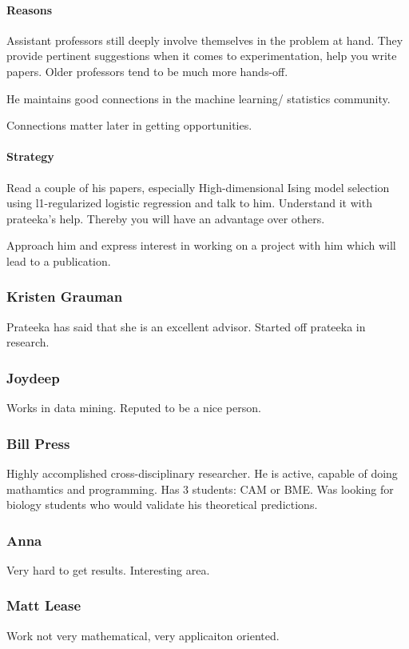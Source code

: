 \documentclass[oneside, article]{memoir}
\begin{document}
\paragraph*{Reasons}
Assistant professors still deeply involve themselves in the problem at hand. They provide pertinent suggestions when it comes to experimentation, help you write papers. Older professors tend to be much more hands-off.

He maintains good connections in the machine learning/ statistics community. 

Connections matter later in getting opportunities.

\paragraph*{Strategy}
Read a couple of his papers, especially High-dimensional Ising model selection using l1-regularized logistic regression and talk to him. Understand it with prateeka's help. Thereby you will have an advantage over others.

Approach him and express interest in working on a project with him which will lead to a publication.

\subsubsection{Kristen Grauman}
\subitem Prateeka has said that she is an excellent advisor.
\subitem Started off prateeka in research.

\subsubsection{Joydeep}
Works in data mining. Reputed to be a nice person.

\subsubsection{Bill Press}
Highly accomplished cross-disciplinary researcher. He is active, capable of doing mathamtics and programming. Has 3 students: CAM or BME. Was looking for biology students who would validate his theoretical predictions.

\subsubsection{Anna}
Very hard to get results. Interesting area.

\subsubsection{Matt Lease}
Work not very mathematical, very applicaiton oriented.
\end{document}
